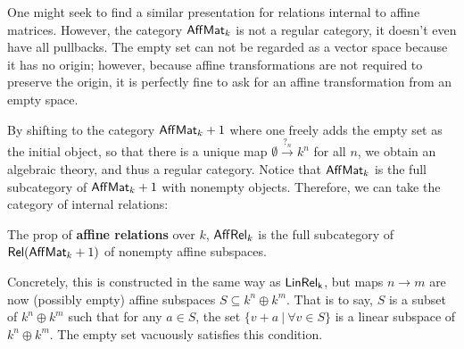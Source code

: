 One might seek to find a similar presentation for relations internal to affine matrices.
However, the category $\mathsf{Aff}\mathsf{Mat}_k$ is not a regular category, it doesn't even have all pullbacks.
The empty set can not be regarded as a vector space because it has no origin; however, because affine transformations are not required to preserve the origin, it is perfectly fine to ask for an affine transformation from an empty space.


By shifting to the category $\mathsf{Aff}\mathsf{Mat}_k+1$ where one freely adds the empty set as the initial object, so that there is a unique map $\emptyset \xrightarrow{?_n} k^n$ for all $n$,  we obtain an algebraic theory, and thus a regular category.  Notice that $\mathsf{Aff}\mathsf{Mat}_k$ is the full subcategory of $\mathsf{Aff}\mathsf{Mat}_k+1$ with nonempty objects.  Therefore, we can take the category of internal relations:
\begin{definition}
\label{def:affrel}
The prop of {\bf affine relations} over $k$, $\mathsf{Aff}\mathsf{Rel}_{k}$ is the full subcategory of  $\mathsf{Rel}(\mathsf{Aff}\mathsf{Mat}_k+1)$ of nonempty affine subspaces.
\end{definition}
Concretely, this is constructed in the same way as $\sf LinRel_k$, but maps $n\to m$ are now (possibly empty) affine subspaces $S \subseteq k^n\oplus k^m$. That is to say, $S$ is a subset of $k^n\oplus k^m$ such that for any $a \in S$, the set $\{v+a\ |\ \forall v \in S\}$ is a linear subspace of  $k^n\oplus k^m$.  The empty set vacuously satisfies this condition.


